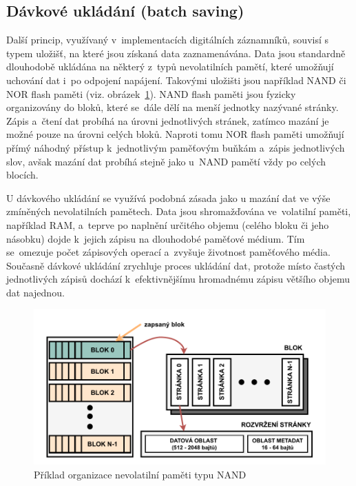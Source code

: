 \newpage


\subsection{Dávkové ukládání (batch saving)}
\label{davkove_zpracovani}
Další princip, využívaný v~implementacích digitálních záznamníků, souvisí s typem uložišť, na které jsou získaná data zaznamenávána. Data jsou standardně dlouhodobě ukládána na některý z~typů nevolatilních pamětí, které umožňují uchování dat i~po odpojení napájení. Takovými uložišti jsou například NAND či NOR flash paměti (viz. obrázek~\ref{fig:batch-processing}). NAND flash paměti jsou fyzicky organizovány do bloků, které se~dále dělí na menší jednotky nazývané stránky. Zápis a~čtení dat probíhá na úrovni jednotlivých stránek, zatímco mazání je možné pouze na úrovni celých bloků.  Naproti tomu NOR flash paměti umožňují přímý náhodný přístup k~jednotlivým paměťovým buňkám a~zápis jednotlivých slov, avšak mazání dat probíhá stejně jako u~NAND pamětí vždy po celých blocích.~\cite{non_volatile_memories, ieee_relationships_among_region_segment_frame_and_cluster}

U dávkového ukládání se využívá podobná zásada jako u mazání dat ve výše zmíněných nevolatilních pamětech. Data jsou shromažďována ve~volatilní paměti, například RAM, a~teprve po naplnění určitého objemu (celého bloku či jeho násobku) dojde k~jejich zápisu na dlouhodobé paměťové médium. Tím se~omezuje počet zápisových operací a~zvyšuje životnost paměťového média. Současně dávkové ukládání zrychluje proces ukládání dat, protože místo častých jednotlivých zápisů dochází k~efektivnějšímu hromadnému zápisu většího objemu dat najednou.~\cite{non_volatile_memories, ieee_digital_sound_recorder_arm_sd_card, ieee_relationships_among_region_segment_frame_and_cluster}

\begin{figure}[h]
    \centering
    \includegraphics[width=1.00\textwidth]{obrazky-figures/nand-architecture-1.pdf}
    
    \caption{Příklad organizace nevolatilní paměti typu NAND~\cite{ieee_relationships_among_region_segment_frame_and_cluster}}
    \label{fig:batch-processing}
\end{figure}

